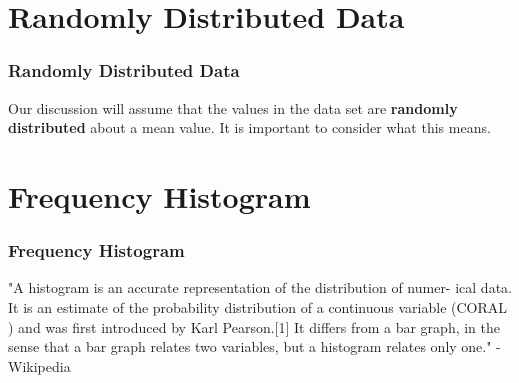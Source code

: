 \documentclass[fleqn]{beamer} %
\newcommand{\sectiontitleII}{Randomly Distributed Data}
\newcommand{\sectiontitleIII}{Frequency Histogram}
\begin{document}
\section{\sectiontitleII}	
	\begin{frame}[label=sectionII] \small
		\frametitle{\sectiontitleII}    
		
				
		Our discussion will assume that the values in the data set are {\bf \PN randomly distributed } about a mean value. It is important to consider what this means.
		

	\end{frame}


\section{\sectiontitleIII}	
	\begin{frame}[label=sectionIII] \small
		\frametitle{\sectiontitleIII}    

		"A {\GR histogram} is an accurate representation of the distribution of numer-
ical data. It is an estimate of the probability distribution of a continuous
variable (CORAL ) and was first introduced by Karl Pearson.[1] It differs
from a bar graph, in the sense that a bar graph relates two variables, but a
histogram relates only one." - Wikipedia

	\end{frame}
	
\end{document}
